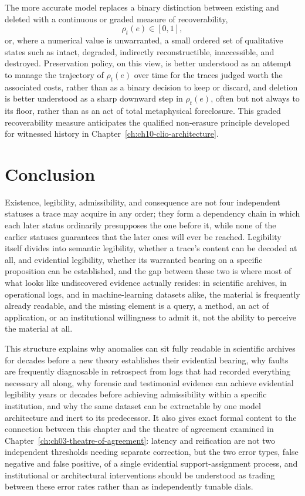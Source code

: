 The more accurate model replaces a binary distinction between existing and deleted with a continuous or graded measure of recoverability,
\[
\rho_t(e) \in [0,1],
\]
or, where a numerical value is unwarranted, a small ordered set of qualitative states such as intact, degraded, indirectly reconstructible, inaccessible, and destroyed. Preservation policy, on this view, is better understood as an attempt to manage the trajectory of $\rho_t(e)$ over time for the traces judged worth the associated costs, rather than as a binary decision to keep or discard, and deletion is better understood as a sharp downward step in $\rho_t(e)$, often but not always to its floor, rather than as an act of total metaphysical foreclosure. This graded recoverability measure anticipates the qualified non-erasure principle developed for witnessed history in Chapter~\ref{ch:ch10-clio-architecture}.

\section{Conclusion}

Existence, legibility, admissibility, and consequence are not four independent statuses a trace may acquire in any order; they form a dependency chain in which each later status ordinarily presupposes the one before it, while none of the earlier statuses guarantees that the later ones will ever be reached. Legibility itself divides into semantic legibility, whether a trace's content can be decoded at all, and evidential legibility, whether its warranted bearing on a specific proposition can be established, and the gap between these two is where most of what looks like undiscovered evidence actually resides: in scientific archives, in operational logs, and in machine-learning datasets alike, the material is frequently already readable, and the missing element is a query, a method, an act of application, or an institutional willingness to admit it, not the ability to perceive the material at all.

This structure explains why anomalies can sit fully readable in scientific archives for decades before a new theory establishes their evidential bearing, why faults are frequently diagnosable in retrospect from logs that had recorded everything necessary all along, why forensic and testimonial evidence can achieve evidential legibility years or decades before achieving admissibility within a specific institution, and why the same dataset can be extractable by one model architecture and inert to its predecessor. It also gives exact formal content to the connection between this chapter and the theatre of agreement examined in Chapter~\ref{ch:ch03-theatre-of-agreement}: latency and reification are not two independent thresholds needing separate correction, but the two error types, false negative and false positive, of a single evidential support-assignment process, and institutional or architectural interventions should be understood as trading between these error rates rather than as independently tunable dials.

